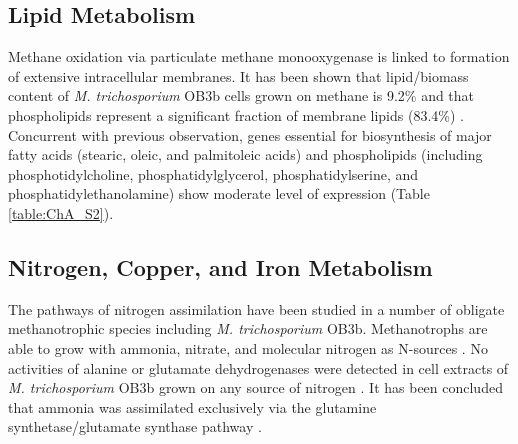 \subsection{Lipid Metabolism}
Methane oxidation via particulate methane monooxygenase is linked to formation of extensive intracellular membranes.
It has been shown that lipid/biomass content of \textit{M. trichosporium} OB3b cells grown on methane is 9.2\% and that phospholipids represent a significant fraction of membrane lipids (83.4\%) \cite{weaver1975, guckert1991}.
Concurrent with previous observation, genes essential for biosynthesis of major fatty acids (stearic, oleic, and palmitoleic acids) and phospholipids (including phosphotidylcholine, phosphatidylglycerol, phosphatidylserine, and phosphatidylethanolamine) show moderate level of expression (Table \ref{table:ChA_S2}).

\subsection{Nitrogen, Copper, and Iron Metabolism}
The pathways of nitrogen assimilation have been studied in a number of obligate methanotrophic species including \textit{M. trichosporium} OB3b.
Methanotrophs are able to grow with ammonia, nitrate, and molecular nitrogen as N-sources \cite{whittenbury1970, shishkina1979, murrell1983a, murrell1983b, chu1998, kim2001}.
No activities of alanine or glutamate dehydrogenases were detected in cell extracts of \textit{M. trichosporium} OB3b grown on any source of nitrogen \cite{shishkina1979, murrell1983a, murrell1983b}.
It has been concluded that ammonia was assimilated exclusively via the glutamine synthetase/glutamate synthase pathway \cite{murrell1983b}.

